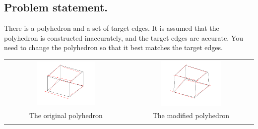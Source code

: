 \documentclass[11pt,fleqn,a4paper]{scrartcl}
\begin{document}
\subsection{Problem statement.}
There is a polyhedron and a set of target edges. It is assumed that the polyhedron is constructed inaccurately, and the target edges are accurate. You need to change the polyhedron so that it best matches the target edges.
\begin{center}
\begin{tabular}{cc}

\includegraphics[width=0.5\textwidth]{input.png} &
\includegraphics[width=0.5\textwidth]{out.png} \\
The original polyhedron& The modified polyhedron \\
\\
\end{tabular}
\end{center}
\end{document}
